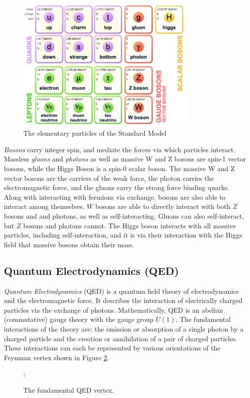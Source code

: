 \begin{figure}[h]
    \centering
    \includegraphics[width=0.8\textwidth]{Figures/1/sm.png}
    \caption{The elementary particles of the Standard Model}
    \label{fig:standardmodel}
\end{figure}

\textit{Bosons} carry integer spin, and mediate the forces via which particles interact. Massless \textit{gluons} and \textit{photons} as well as massive W and Z bosons are spin-1 vector bosons, while the Higgs Boson is a spin-0 scalar boson. The massive W and Z vector bosons are the carriers of the weak force, the photon carries the electromagnetic force, and the gluons carry the strong force binding quarks. Along with interacting with fermions via exchange, bosons are also able to interact among themselves. $W$ bosons are able to directly interact with both $Z$ bosons and and photons, as well as self-interacting. Gluons can also self-interact, but $Z$ bosons and photons cannot. The Higgs boson interacts with all massive particles, including self-interaction, and it is via their interaction with the Higgs field that massive bosons obtain their mass.

\subsection{Quantum Electrodynamics (QED)}
\textit{Quantum Electrodynamics} (QED) \cite{Feynman, schwartz, peskin} is a quantum field theory of electrodynamics and the electromagnetic force. It describes the interaction of electrically charged particles via the exchange of photons. Mathematically, QED is an abelian (commutative) gauge theory with the gauge group $U(1)$. The fundamental interactions of the theory are: the emission or absorption of a single photon by a charged particle and the creation or annihilation of a pair of charged particles. These interactions can each be represented by various orientations of the Feynman vertex shown in Figure \ref{fig:QEDvertex}. 
\begin{figure}[h!]
    \centering
    ;
    \caption{The fundamental QED vertex.}
    \label{fig:QEDvertex}
\end{figure}

